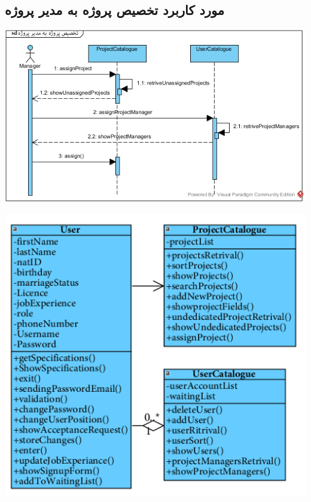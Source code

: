 \newpage
\vspace{1cm}
\subsection*{مورد کاربرد تخصیص پروژه به مدیر پروژه}
\vspace{1cm}
\begin{center}
\includegraphics[width=\textwidth]{SequenceDiagrams/34.jpg}
\end{center}

\newpage
\vspace{2cm}
\begin{center}
\includegraphics[width=\textwidth]{SequenceClasses/34.png}
\end{center}

